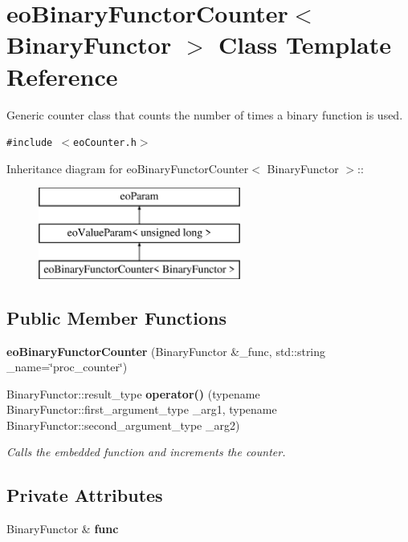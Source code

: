 \section{eo\-Binary\-Functor\-Counter$<$ Binary\-Functor $>$ Class Template Reference}
\label{classeo_binary_functor_counter}
Generic counter class that counts the number of times a binary function is used.  


{\tt \#include $<$eo\-Counter.h$>$}

Inheritance diagram for eo\-Binary\-Functor\-Counter$<$ Binary\-Functor $>$::\begin{figure}[H]
\begin{center}
\leavevmode
\includegraphics[height=3cm]{classeo_binary_functor_counter}
\end{center}
\end{figure}
\subsection*{Public Member Functions}
\begin{CompactItemize}
\item 
{\bf eo\-Binary\-Functor\-Counter} (Binary\-Functor \&\_\-func, std::string \_\-name=\char`\"{}proc\_\-counter\char`\"{})\label{classeo_binary_functor_counter_a0}

\item 
Binary\-Functor::result\_\-type {\bf operator()} (typename Binary\-Functor::first\_\-argument\_\-type \_\-arg1, typename Binary\-Functor::second\_\-argument\_\-type \_\-arg2)
\begin{CompactList}\small\item\em Calls the embedded function and increments the counter. \item\end{CompactList}\end{CompactItemize}
\subsection*{Private Attributes}
\begin{CompactItemize}
\item 
Binary\-Functor \& {\bf func}\label{classeo_binary_functor_counter_r0}

\end{CompactItemize}



